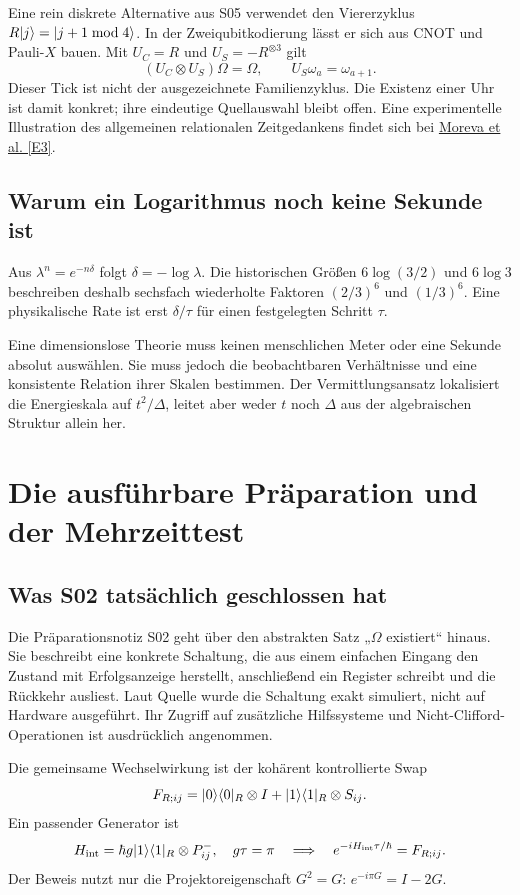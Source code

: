 Eine rein diskrete Alternative aus S05 verwendet den Viererzyklus $R\lvert j\rangle=\lvert j+1\bmod4\rangle$. In der Zweiqubitkodierung lässt er sich aus CNOT und Pauli-$X$ bauen. Mit $U_C=R$ und $U_S=-R^{\otimes3}$ gilt
\begin{equation}
(U_C\otimes U_S)\Omega=\Omega,\qquad U_S\omega_a=\omega_{a+1}.
\end{equation}
Dieser Tick ist nicht der ausgezeichnete Familienzyklus. Die Existenz einer Uhr ist damit konkret; ihre eindeutige Quellauswahl bleibt offen. Eine experimentelle Illustration des allgemeinen relationalen Zeitgedankens findet sich bei \href{https://arxiv.org/abs/1310.4691}{Moreva et al. [E3]}.

\section{Warum ein Logarithmus noch keine Sekunde ist}
Aus $\lambda^n=e^{-n\delta}$ folgt $\delta=-\log\lambda$. Die historischen Größen $6\log(3/2)$ und $6\log3$ beschreiben deshalb sechsfach wiederholte Faktoren $(2/3)^6$ und $(1/3)^6$. Eine physikalische Rate ist erst $\delta/\tau$ für einen festgelegten Schritt $\tau$.

Eine dimensionslose Theorie muss keinen menschlichen Meter oder eine Sekunde absolut auswählen. Sie muss jedoch die beobachtbaren Verhältnisse und eine konsistente Relation ihrer Skalen bestimmen. Der Vermittlungsansatz lokalisiert die Energieskala auf $t^2/\Delta$, leitet aber weder $t$ noch $\Delta$ aus der algebraischen Struktur allein her.

\chapter{Die ausführbare Präparation und der Mehrzeittest}
\label{ch:echo}
\section{Was S02 tatsächlich geschlossen hat}
Die Präparationsnotiz S02 geht über den abstrakten Satz „$\Omega$ existiert“ hinaus. Sie beschreibt eine konkrete Schaltung, die aus einem einfachen Eingang den Zustand mit Erfolgsanzeige herstellt, anschließend ein Register schreibt und die Rückkehr ausliest. Laut Quelle wurde die Schaltung exakt simuliert, nicht auf Hardware ausgeführt. Ihr Zugriff auf zusätzliche Hilfssysteme und Nicht-Clifford-Operationen ist ausdrücklich angenommen.

Die gemeinsame Wechselwirkung ist der kohärent kontrollierte Swap
\begin{equation}
F_{R;ij}=\lvert0\rangle\langle0\rvert_R\otimes I+\lvert1\rangle\langle1\rvert_R\otimes S_{ij}.
\end{equation}
Ein passender Generator ist
\begin{equation}
H_{\mathrm{int}}=\hbar g\lvert1\rangle\langle1\rvert_R\otimes P^-_{ij},\quad
g\tau=\pi\quad\Longrightarrow\quad e^{-iH_{\mathrm{int}}\tau/\hbar}=F_{R;ij}.
\end{equation}
Der Beweis nutzt nur die Projektoreigenschaft $G^2=G$: $e^{-i\pi G}=I-2G$.

